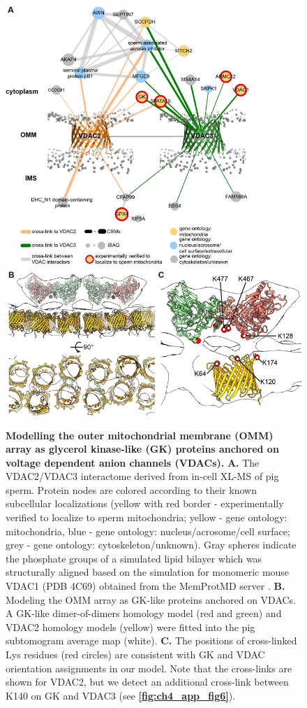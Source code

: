 \begin{figure}[p]
	\center
	\includegraphics[]{Chapter.4/Figures/Figure4.png}
	\caption{}
	\label{fig:ch4_fig4}
\end{figure}
\addtocounter{figure}{-1}
\begin{figure}[ht]
	\caption{\textbf{Modelling the outer mitochondrial membrane (OMM) array as glycerol kinase-like (GK) proteins anchored on voltage dependent anion channels (VDACs).} \textbf{A.} The VDAC2/VDAC3 interactome derived from in-cell XL-MS of pig sperm. Protein nodes are colored according to their known subcellular localizations (yellow with red border - experimentally verified to localize to sperm mitochondria; yellow - gene ontology: mitochondria, blue - gene ontology: nucleus/acrosome/cell surface; grey - gene ontology: cytoskeleton/unknown). Gray spheres indicate the phosphate groups of a simulated lipid bilayer which was structurally aligned based on the simulation for  monomeric mouse VDAC1 (PDB 4C69) obtained from the MemProtMD server \cite{Newport2019}. \textbf{B.} Modeling the OMM array as GK-like proteins anchored on VDACs. A GK-like dimer-of-dimers homology model (red and green) and VDAC2 homology models (yellow) were fitted into the pig subtomogram average map (white). \textbf{C.} The positions of cross-linked Lys residues (red circles) are consistent with GK and VDAC orientation assignments in our model. Note that the cross-links are shown for VDAC2, but we detect an additional cross-link between K140 on GK and VDAC3 (see \textbf{\autoref{fig:ch4_app_fig6}}).}
\end{figure}
